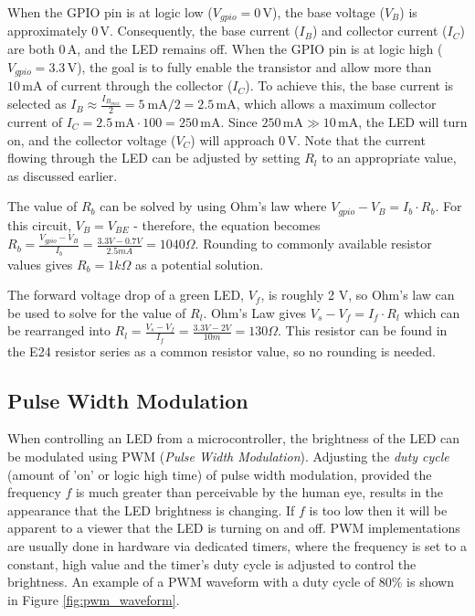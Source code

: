 \documentclass[main.tex]{subfiles}
\begin{document}
\noindent When the GPIO pin is at logic low (\( V_{gpio} = 0\,\text{V} \)), the base voltage (\( V_B \)) is approximately \( 0\,\text{V} \). Consequently, the base current (\( I_B \)) and collector current (\( I_C \)) are both \( 0\,\text{A} \), and the LED remains off. When the GPIO pin is at logic high (\( V_{gpio} = 3.3\,\text{V} \)), the goal is to fully enable the transistor and allow more than \( 10\,\text{mA} \) of current through the collector (\( I_C \)). To achieve this, the base current is selected as \( I_B \approx \frac{I_{B_{max}}}{2} = 5 \ \text{mA}/2 = 2.5\,\text{mA} \), which allows a maximum collector current of \( I_C = 2.5\,\text{mA} \cdot 100 = 250\,\text{mA} \). Since \( 250\,\text{mA} \gg 10\,\text{mA} \), the LED will turn on, and the collector voltage (\( V_C \)) will approach \( 0\,\text{V} \). Note that the current flowing through the LED can be adjusted by setting \( R_l \) to an appropriate value, as discussed earlier. \newline

\newnoindentpara The value of $R_b$ can be solved by using Ohm's law where $V_{gpio} - V_B = I_b \cdot R_b$. For this circuit, $V_B = V_{BE}$ - therefore, the equation becomes $R_b = \frac{V_{gpio} - V_B}{I_b} = \frac{3.3V-0.7V}{2.5mA} = 1040 \Omega$. Rounding to commonly available resistor values gives  $R_b = 1 k \Omega$ as a potential solution. \newline

\newnoindentpara The forward voltage drop of a green LED, $V_f$, is roughly 2 V, so Ohm's law can be used to solve for the value of $R_l$. Ohm's Law gives $V_s - V_f = I_f \cdot R_l$ which can be rearranged into $R_l = \frac{V_s - V_f}{I_f} = \frac{3.3V-2V}{10m} = 130 \Omega$. This resistor can be found in the E24 resistor series as a common resistor value, so no rounding is needed. 

\subsection{Pulse Width Modulation}
When controlling an LED from a microcontroller, the brightness of the LED can be modulated using PWM (\textit{Pulse Width Modulation}). Adjusting the \textit{duty cycle} (amount of 'on' or logic high time) of pulse width modulation, provided the frequency $f$ is much greater than perceivable by the human eye, results in the appearance that the LED brightness is changing. If $f$ is too low then it will be apparent to a viewer that the LED is turning on and off. PWM implementations are usually done in hardware via dedicated timers, where the frequency is set to a constant, high value and the timer's duty cycle is adjusted to control the brightness. An example of a PWM waveform with a duty cycle of 80\% is shown in Figure \ref{fig:pwm_waveform}.
\end{document}
